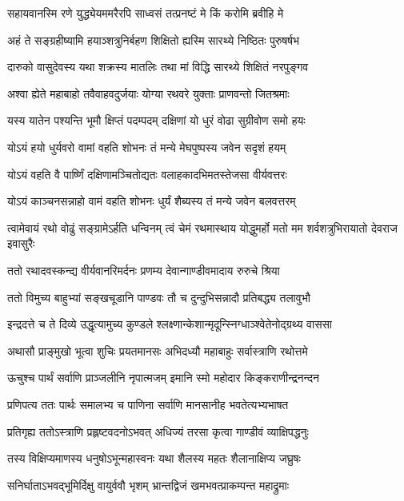 \twolineshloka
{सहायवानस्मि रणे युद्ध्येयममरैरपि}
{साध्वसं तत्प्रनष्टं मे किं करोमि ब्रवीहि मे}


\twolineshloka
{अहं ते सङ्ग्रहीष्यामि हयाञ्शत्रुनिर्बहण}
{शिक्षितो ह्यस्मि सारथ्ये निष्ठितः पुरुषर्षभ}


\twolineshloka
{दारुको वासुदेवस्य यथा शक्रस्य मातलिः}
{तथा मां विद्धि सारथ्ये शिक्षितं नरपुङ्गव}


\twolineshloka
{अश्वा ह्येते महाबाहो तवैवाहवदुर्जयाः}
{योग्या रथवरे युक्ताः प्राणवन्तो जितश्रमाः}


\twolineshloka
{यस्य यातेन पश्यन्ति भूमौ क्षिप्तं पदम्पदम्}
{दक्षिणां यो धुरं वोढा सुग्रीवोण समो हयः}


\twolineshloka
{योऽयं हयो धुर्यवरो वामां वहति शोभनः}
{तं मन्ये मेघपुष्पस्य जवेन सदृशं हयम्}


\twolineshloka
{योऽयं वहति वै पार्ष्णिं दक्षिणामञ्चितोद्यतः}
{वलाहकादभिमतस्तेजसा वीर्यवत्तरः}


\twolineshloka
{योऽयं काञ्चनसन्नाहो वामं वहति शोभनः}
{धुर्यं शैब्यस्य तं मन्ये जवेन बलवत्तरम्}


\threelineshloka
{त्वामेवायं रथो वोढुं सङ्ग्रामेऽर्हति धन्विनम्}
{त्वं चेमं रथमास्थाय योद्धुमर्हो मतो मम}
{शर्वशत्रुभिरायातो देवराज इवासुरैः}



\twolineshloka
{ततो रथादवस्कन्द्य वीर्यवानरिमर्दनः}
{प्रणम्य देवान्गाण्डीवमादाय रुरुचे श्रिया}


\twolineshloka
{ततो विमुच्य बाहुभ्यां सङ्खचूडानि पाण्डवः}
{तौ च दुन्दुभिसन्नादौ प्रतिबद्ध्य तलावुभौ}


\twolineshloka
{इन्द्रदत्ते च ते दिव्ये उद्धृत्यामुच्य कुण्डले}
{श्लक्ष्णान्केशान्मृदून्स्निग्धाञ्श्वेतेनोद्ग्रथ्य वाससा}


\twolineshloka
{अथासौ प्राङ्मुखो भूत्वा शुचिः प्रयतमानसः}
{अभिदध्यौ महाबाहुः सर्वास्त्राणि रथोत्तमे}


\twolineshloka
{ऊचुश्च पार्थं सर्वाणि प्राञ्जलीनि नृपात्मजम्}
{इमानि स्मो महोदार किङ्कराणीन्द्रनन्दन}


\twolineshloka
{प्रणिपत्य ततः पार्थः समालभ्य च पाणिना}
{सर्वाणि मानसानीह भवतेत्यभ्यभाषत}


\twolineshloka
{प्रतिगृह्य ततोऽस्त्राणि प्रह्लष्टवदनोऽभवत्}
{अधिज्यं तरसा कृत्वा गाण्डीवं व्याक्षिपद्धनुः}


\twolineshloka
{तस्य विक्षिप्यमाणस्य धनुषोऽभून्महास्वनः}
{यथा शैलस्य महतः शैलानाक्षिप्य जघ्रुषः}


\twolineshloka
{सनिर्घाताऽभवद्भूमिर्दिक्षु वायुर्ववौ भृशम्}
{भ्रान्तद्विजं खमभवत्प्राकम्पन्त महाद्रुमाः}


